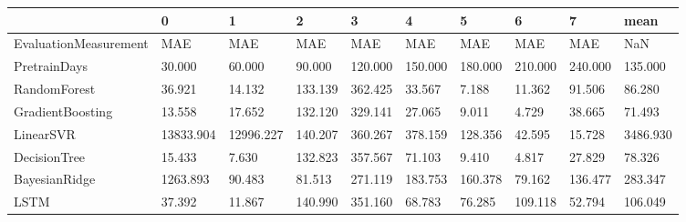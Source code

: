 \begin{tabular}{llllllllll}
\toprule
{} &         0 &         1 &       2 &       3 &       4 &       5 &       6 &       7 &     mean \\
\midrule
EvaluationMeasurement &       MAE &       MAE &     MAE &     MAE &     MAE &     MAE &     MAE &     MAE &      NaN \\
PretrainDays          &    30.000 &    60.000 &  90.000 & 120.000 & 150.000 & 180.000 & 210.000 & 240.000 &  135.000 \\
RandomForest          &    36.921 &    14.132 & 133.139 & 362.425 &  33.567 &   7.188 &  11.362 &  91.506 &   86.280 \\
GradientBoosting      &    13.558 &    17.652 & 132.120 & 329.141 &  27.065 &   9.011 &   4.729 &  38.665 &   71.493 \\
LinearSVR             & 13833.904 & 12996.227 & 140.207 & 360.267 & 378.159 & 128.356 &  42.595 &  15.728 & 3486.930 \\
DecisionTree          &    15.433 &     7.630 & 132.823 & 357.567 &  71.103 &   9.410 &   4.817 &  27.829 &   78.326 \\
BayesianRidge         &  1263.893 &    90.483 &  81.513 & 271.119 & 183.753 & 160.378 &  79.162 & 136.477 &  283.347 \\
LSTM                  &    37.392 &    11.867 & 140.990 & 351.160 &  68.783 &  76.285 & 109.118 &  52.794 &  106.049 \\
\bottomrule
\end{tabular}
